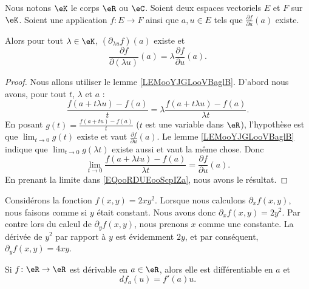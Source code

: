 \begin{lemma}       \label{LEMooVOTHooPJcrWH}
	Nous notons \( \eK\) le corps \( \eR\) ou \( \eC\). Soient deux espaces vectoriels \( E\) et \( F\) sur \( \eK\). Soient une application \( f\colon E\to F\) ainsi que \( a,u\in E\) tels que \( \frac{ \partial f }{ \partial u }(a)\) existe.

	Alors pour tout \( \lambda\in \eK\), \( (\partial_{\lambda u}f)(a)\) existe et
	\begin{equation}
		\frac{ \partial f }{ \partial (\lambda u) }(a)=\lambda\frac{ \partial f }{ \partial u }(a).
	\end{equation}
\end{lemma}

\begin{proof}
	Nous allons utiliser le lemme \ref{LEMooYJGLooVBaglB}. D'abord nous avons, pour tout \( t\), \( \lambda\) et \( a\)  :
	\begin{equation}        \label{EQooRDUEooScpIZa}
		\frac{ f(a+t\lambda u)-f(a) }{ t }=\lambda\frac{ f(a+t\lambda u)-f(a) }{ \lambda t }.
	\end{equation}
	En posant \( g(t)=\frac{ f(a+tu)-f(a) }{ t }\) (\( t\) est une variable dans \( \eR\)), l'hypothèse est que \( \lim_{t\to 0} g(t)\) existe et vaut \( \frac{ \partial f }{ \partial u }(a)\). Le lemme \ref{LEMooYJGLooVBaglB} indique que \( \lim_{t\to 0} g(\lambda t)\) existe aussi et vaut la même chose. Donc
	\begin{equation}
		\lim_{t\to 0} \frac{ f(a+\lambda tu)-f(a) }{ \lambda t }=\frac{ \partial f }{ \partial u }(a).
	\end{equation}
	En prenant la limite dans \eqref{EQooRDUEooScpIZa}, nous avons le résultat.
\end{proof}

\begin{example}
	Considérons la fonction \( f(x,y)=2xy^2\). Lorsque nous calculons \( \partial_xf(x,y)\), nous faisons comme si \( y\) était constant. Nous avons donc \( \partial_xf(x,y)=2y^2\). Par contre lors du calcul de \( \partial_yf(x,y)\), nous prenons \( x\) comme une constante. La dérivée de \( y^2\) par rapport à \( y\) est évidemment \( 2y\), et par conséquent, \( \partial_yf(x,y)=4xy\).
\end{example}

\begin{proposition}	\label{PROPooJDJJooInDpCd}
	Si \(f \colon \eR\to \eR  \) est dérivable en \( a\in \eR\), alors elle est différentiable en \( a\) et
	\begin{equation}
		df_a(u)=f'(a)u.
	\end{equation}
\end{proposition}

